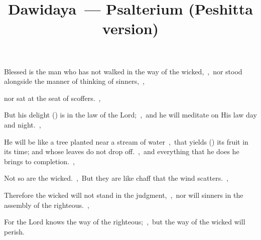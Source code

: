 \documentclass[12pt,twoside,a5paper]{article}
\begin{document}

\title{Dawidaya~--- Psalterium (Peshitta version)}
\author{}
\date{}
\maketitle






\begin{normalparskip}
  Blessed is the man who has not walked in the way of the wicked,~\sep\ nor stood alongside the manner of thinking of sinners,~\sep


  nor sat at the seat of scoffers.~\sep

  But his delight () is in the law of the Lord;~\sep\ and he will meditate on His law day and night.~\sep

  He will be like a tree planted near a stream of water~\sep\ that yields () its fruit in its time; and whose leaves do not drop off.~\sep\ and everything that he does he brings to completion.~\sep

  Not so are the wicked.~\sep\ But they are like chaff that the wind scatters.~\sep

  Therefore the wicked will not stand in the judgment,~\sep\ nor will sinners in the assembly of the righteous.~\sep

  For the Lord knows the way of the righteous;~\sep\ but the way of the wicked will perish.
\end{normalparskip}

\end{document}
